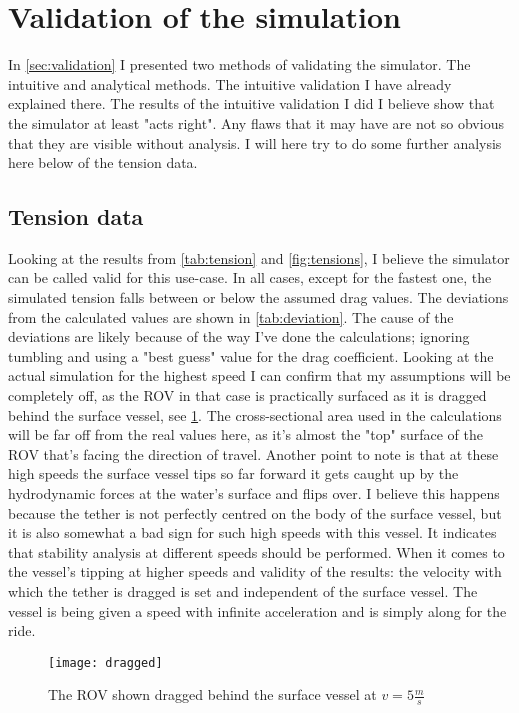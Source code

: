 \section{Validation of the simulation}
In \cref{sec:validation} I presented two methods of validating the simulator. The intuitive and analytical methods. The intuitive validation I have already explained there. The results of the intuitive validation I did I believe show that the simulator at least "acts right". Any flaws that it may have are not so obvious that they are visible without analysis. I will here try to do some further analysis here below of the tension data. 

\subsection{Tension data}
Looking at the results from \cref{tab:tension} and \cref{fig:tensions}, I believe the simulator can be called valid for this use-case. In all cases, except for the fastest one, the simulated tension falls between or below the assumed drag values.  The deviations from the calculated values are shown in \cref{tab:deviation}. The cause of the deviations are likely because of the way I've done the calculations; ignoring tumbling and using a "best guess" value for the drag coefficient. Looking at the actual simulation for the highest speed I can confirm that my assumptions will be completely off, as the ROV in that case is practically surfaced as it is dragged behind the surface vessel, see \cref{fig:dragged}. The cross-sectional area used in the calculations will be far off from the real values here, as it's almost the "top" surface of the ROV that's facing the direction of travel. Another point to note is that at these high speeds the surface vessel tips so far forward it gets caught up by the hydrodynamic forces at the water's surface and flips over. I believe this happens because the tether is not perfectly centred on the body of the surface vessel, but it is also somewhat a bad sign for such high speeds with this vessel. It indicates that stability analysis at different speeds should be performed. When it comes to the vessel's tipping at higher speeds and validity of the results: the velocity with which the tether is dragged is set and independent of the surface vessel. The vessel is being given a speed with infinite acceleration and is simply along for the ride.

\begin{figure}
	\centering
	\texttt{[image: dragged]}
	\caption{The ROV shown dragged behind the surface vessel at \(v=5\frac{m}{s}\)}
	\label{fig:dragged}
\end{figure}

